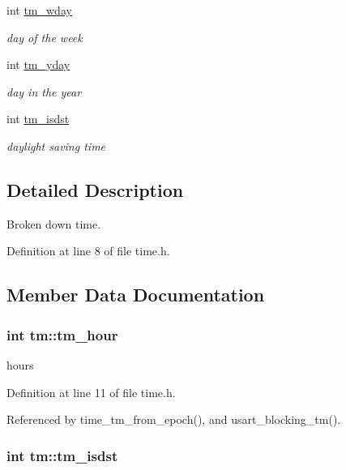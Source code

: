 \begin{DoxyCompactItemize}
int \hyperlink{structtm_afe81a8c46f1c693c43f259b288859f4f}{tm\+\_\+wday}
\begin{DoxyCompactList}\small\item\em day of the week \end{DoxyCompactList}\item 
int \hyperlink{structtm_a93a0ba77cc23796df84405dcbcc57eb1}{tm\+\_\+yday}
\begin{DoxyCompactList}\small\item\em day in the year \end{DoxyCompactList}\item 
int \hyperlink{structtm_a5645ca0580c8ab2c24f6c2965d9c9f9c}{tm\+\_\+isdst}
\begin{DoxyCompactList}\small\item\em daylight saving time \end{DoxyCompactList}\end{DoxyCompactItemize}


\subsection{Detailed Description}
Broken down time. 

Definition at line 8 of file time.\+h.



\subsection{Member Data Documentation}
\hypertarget{structtm_a3e7ca4e37f1abcaf56b8a916c38eb9fe}{}
\subsubsection[{tm\+\_\+hour}]{\setlength{\rightskip}{0pt plus 5cm}int tm\+::tm\+\_\+hour}\label{structtm_a3e7ca4e37f1abcaf56b8a916c38eb9fe}


hours 



Definition at line 11 of file time.\+h.



Referenced by time\+\_\+tm\+\_\+from\+\_\+epoch(), and usart\+\_\+blocking\+\_\+tm().

\hypertarget{structtm_a5645ca0580c8ab2c24f6c2965d9c9f9c}{}
\subsubsection[{tm\+\_\+isdst}]{\setlength{\rightskip}{0pt plus 5cm}int tm\+::tm\+\_\+isdst}\label{structtm_a5645ca0580c8ab2c24f6c2965d9c9f9c}


